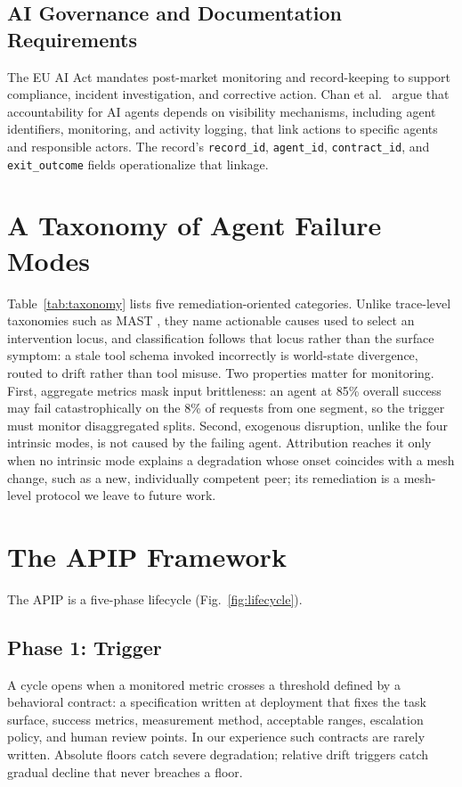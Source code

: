 \documentclass[conference]{IEEEtran}
\begin{document}
\subsection{AI Governance and Documentation Requirements}

The EU AI Act \cite{ref6} mandates post-market monitoring and record-keeping to support compliance, incident investigation, and corrective action. Chan et al.~\cite{ref14} argue that accountability for AI agents depends on visibility mechanisms, including agent identifiers, monitoring, and activity logging, that link actions to specific agents and responsible actors. The record's \texttt{record\_id}, \texttt{agent\_id}, \texttt{contract\_id}, and \texttt{exit\_outcome} fields operationalize that linkage.

\section{A Taxonomy of Agent Failure Modes}

Table~\ref{tab:taxonomy} lists five remediation-oriented categories. Unlike trace-level taxonomies such as MAST \cite{ref8}, they name actionable causes used to select an intervention locus, and classification follows that locus rather than the surface symptom: a stale tool schema invoked incorrectly is world-state divergence, routed to drift rather than tool misuse. Two properties matter for monitoring. First, aggregate metrics mask input brittleness: an agent at 85\% overall success may fail catastrophically on the 8\% of requests from one segment, so the trigger must monitor disaggregated splits. Second, exogenous disruption, unlike the four intrinsic modes, is not caused by the failing agent. Attribution reaches it only when no intrinsic mode explains a degradation whose onset coincides with a mesh change, such as a new, individually competent peer; its remediation is a mesh-level protocol we leave to future work.

\section{The APIP Framework}

The APIP is a five-phase lifecycle (Fig.~\ref{fig:lifecycle}).

\subsection{Phase 1: Trigger}

A cycle opens when a monitored metric crosses a threshold defined by a behavioral contract: a specification written at deployment that fixes the task surface, success metrics, measurement method, acceptable ranges, escalation policy, and human review points. In our experience such contracts are rarely written. Absolute floors catch severe degradation; relative drift triggers catch gradual decline that never breaches a floor.
\end{document}
